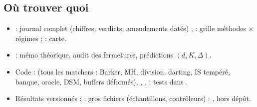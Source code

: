 \subsection{Où trouver quoi}
\begin{itemize}
  \item {} : journal complet (chiffres, verdicts, amendements datés) ;  : grille méthodes $\times$ régimes ;  : carte.
  \item {} : mémo théorique, audit des fermetures, prédictions $(d,K,\Delta)$.
  \item Code :  (tous les matchers : Barker, MH, division, darting, IS tempéré, banque, oracle, DSM, buffers déformés), , ,  ; tests dans .
  \item Résultats versionnés :  ; gros fichiers (échantillons, contrôleurs) : , hors dépôt.
\end{itemize}
